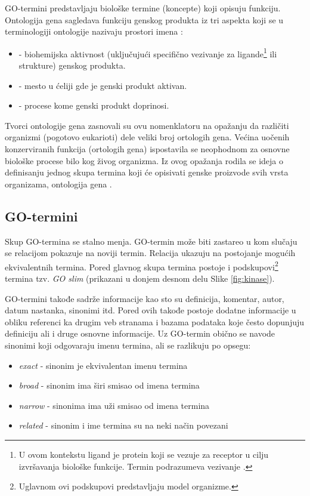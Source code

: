 GO-termini predstavljaju biološke
termine (koncepte) koji opisuju funkciju. Ontologija gena sagledava funkciju
genskog produkta iz tri aspekta koji se u terminologiji ontologije nazivaju
prostori imena :
\begin{itemize}
  \item {} - biohemijska aktivnost (uključujući
    specifično vezivanje za ligande\footnote{
      U ovom kontekstu ligand je protein koji se vezuje za receptor u cilju
      izvršavanja biološke funkcije. Termin podrazumeva vezivanje .
    } ili strukture) genskog produkta.
  \item {} - mesto u ćeliji gde je genski
    produkt aktivan.
  \item {} - procese kome genski produkt doprinosi.
\end{itemize}

Tvorci ontologije gena zasnovali su ovu nomenklatoru na opažanju da različiti
organizmi (pogotovo eukarioti) dele veliki broj ortologih gena. Većina uočenih
konzerviranih funkcija (ortologih gena) ispostavila se neophodnom za osnovne
biološke procese bilo kog živog organizma.  Iz ovog opažanja rodila se ideja o
definisanju jednog skupa termina koji će opisivati genske proizvode svih vrsta
organizama, ontologija gena \parencite{GO2000}.


\subsection{GO-termini}

Skup GO-termina se stalno menja. GO-termin može biti zastareo u kom slučaju se 
relacijom  pokazuje na noviji termin. Relacija
 ukazuju na postojanje mogućih ekvivalentnih termina. Pored
glavnog skupa termina postoje i podskupovi\footnote{Uglavnom ovi podskupovi
predstavljaju model organizme.} termina tzv. \textit{GO slim} (prikazani u donjem desnom
delu Slike \ref{fig:kinase}).

GO-termini takođe sadrže informacije kao sto su definicija, komentar, autor,
datum nastanka, sinonimi itd. Pored ovih takođe postoje dodatne informacije u
obliku referenci ka drugim veb stranama i bazama podataka koje često dopunjuju
definiciju ali i druge osnovne informacije.  Uz GO-termin obično se navode
sinonimi koji odgovaraju imenu termina, ali se razlikuju po opsegu:
\begin{itemize}
  \item \textit{exact} - sinonim je ekvivalentan imenu termina
  \item \textit{broad} - sinonim ima širi smisao od imena termina
  \item \textit{narrow} - sinonima ima uži smisao od imena termina
  \item \textit{related} - sinonim i ime termina su na neki način povezani
\end{itemize}

